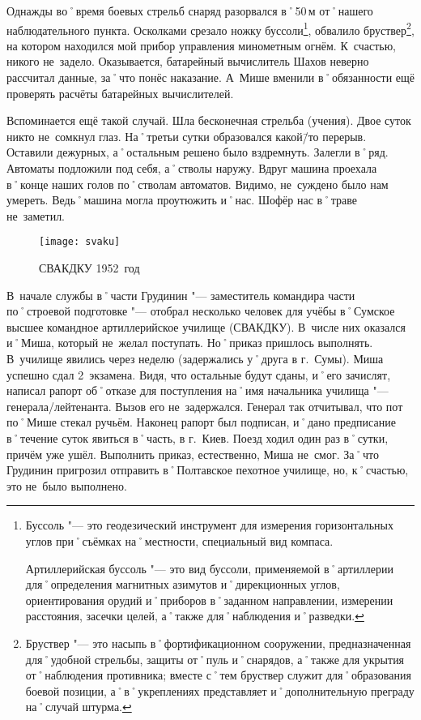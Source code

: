 Однажды во˚время боевых стрельб снаряд разорвался в˚50\,м от˚нашего наблюдательного пункта. Осколками срезало ножку буссоли\footnote{Буссоль "--- это геодезический инструмент для измерения горизонтальных углов при˚съёмках на˚местности, специальный вид компаса. 

Артиллерийская буссоль "--- это вид буссоли, применяемой в˚артиллерии для˚определения магнитных азимутов и˚дирекционных углов, ориентирования орудий и˚приборов в˚заданном направлении, измерении расстояния, засечки целей, а˚также для˚наблюдения и˚разведки.}, обвалило бруствер\footnote{Бруствер "--- это насыпь в˚фортификационном сооружении, предназначенная для˚удобной стрельбы, защиты от˚пуль и˚снарядов, а˚также для укрытия от˚наблюдения противника; вместе с˚тем бруствер служит для˚образования боевой позиции, а˚в˚укреплениях представляет и˚дополнительную преграду на˚случай штурма.}, на котором находился мой прибор управления минометным огнём. К~счастью, никого не~задело. Оказывается, батарейный вычислитель Шахов неверно рассчитал данные, за˚что понёс наказание. А~Мише вменили в˚обязанности ещё проверять расчёты батарейных вычислителей. 

Вспоминается ещё такой случай. Шла бесконечная стрельба (учения). Двое суток никто не~сомкнул глаз. На˚третьи сутки образовался какой\=/то перерыв. Оставили дежурных, а˚остальным решено было вздремнуть. Залегли в˚ряд. Автоматы подложили под себя, а˚стволы наружу. Вдруг машина проехала в˚конце наших голов по˚стволам автоматов. Видимо, не~суждено было нам умереть. Ведь˚машина могла проутюжить и˚нас. Шофёр нас в˚траве не~заметил.

\begin{wrapfigure}{O}{.4\textwidth}
\centering
\texttt{[image: svaku]}
\caption[СВАКДКУ 1952~год]{СВАКДКУ 1952~год\footnotemark}
\label{fig:svaku}
\end{wrapfigure}

В~начале службы в˚части Грудинин "--- заместитель командира части по˚строевой подготовке "--- отобрал несколько человек для учёбы в˚Сумское высшее командное артиллерийское училище (СВАКДКУ). В~числе них оказался и˚Миша, который не~желал поступать. Но˚приказ пришлось выполнять. В~училище явились через неделю (задержались у˚друга в г.~Сумы). Миша успешно сдал 2~экзамена. Видя, что остальные будут сданы, и˚его зачислят, написал рапорт об˚отказе для поступления на˚имя начальника училища "--- генерала\-/лейтенанта. Вызов его не~задержался. Генерал так отчитывал, что пот по˚Мише стекал ручьём. Наконец рапорт был подписан, и˚дано предписание в˚течение суток явиться в˚часть, в г.~Киев. Поезд ходил один раз в˚сутки, причём уже ушёл. Выполнить приказ, естественно, Миша не~смог. За˚что Грудинин пригрозил отправить в˚Полтавское пехотное училище, но, к˚счастью, это не~было выполнено. 

